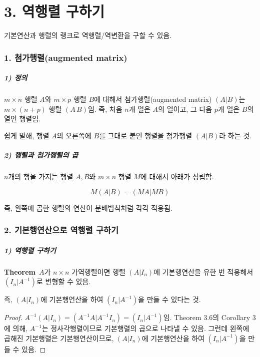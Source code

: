 \newpage


\part*{3. 역행렬 구하기}

기본연산과 행렬의 랭크로 역행렬/역변환을 구할 수 있음.

\section*{1. 첨가행렬(augmented matrix)}
\subsubsection*{1) 정의\\}
\begin{DEF}
$m \times n$ 행렬 $A$와 $m \times p$ 행렬 $B$에 대해서 첨가행렬(augmented matrix) $(A|B)$는 $m \times (n+p)$ 행렬 $(A\,B)$임. 즉, 처음 $n$개 열은 $A$의 열이고, 그 다음 $p$개 열은 $B$의 열인 행렬임.
\end{DEF}

쉽게 말해, 행렬 $A$의 오른쪽에 $B$를 그대로 붙인 행렬을 첨가행렬 $(A|B)$라 하는 것.

\subsubsection*{2) 행렬과 첨가행렬의 곱}
$n$개의 행을 가지는 행렬 $A,B$와 $m \times n$ 행렬 $M$에 대해서 아래가 성립함.

\[
M(A|B)=(MA|MB)
\]

즉, 왼쪽에 곱한 행렬의 연산이 분배법칙처럼 각각 적용됨.


\section*{2. 기본행연산으로 역행렬 구하기}
\subsubsection*{1) 역행렬 구하기}
\textbf{Theorem}\, $A$가 $n \times n$ 가역행렬이면 행렬 $(A|I_n)$에 기본행연산을 유한 번 적용해서 $(I_n|A^{-1})$로 변형할 수 있음.

즉, $(A|I_n)$에 기본행연산을 하여 $(I_n|A^{-1})$을 만들 수 있다는 것.

\begin{proof}
$A^{-1}(A|I_n)=(A^{-1}A|A^{-1}I_n)=(I_n|A^{-1})$임. Theorem 3.6의 Corollary 3에 의해, $A^{-1}$는 정사각행렬이므로 기본행렬의 곱으로 나타낼 수 있음. 그런데 왼쪽에 곱해진 기본행렬은 기본행연산이므로, $(A|I_n)$에 기본행연산을 하여 $(I_n|A^{-1})$을 만들 수 있음.
\end{proof}

